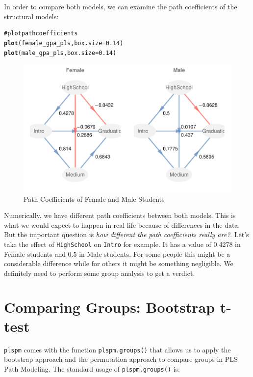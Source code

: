 \documentclass[12pt]{book}\usepackage{graphicx, color}
\makeatletter
\newcommand{\hlfunctioncall}[1]{\textcolor[rgb]{0.501960784313725,0,0.329411764705882}{\textbf{#1}}}%
\newcommand{\hlcomment}[1]{\textcolor[rgb]{0.180392156862745,0.6,0.341176470588235}{#1}}%
\newenvironment{kframe}{%
 \def\at@end@of@kframe{}%
 \ifinner\ifhmode%
  \def\at@end@of@kframe{\end{minipage}}%
  \begin{minipage}{\columnwidth}%
 \fi\fi%
 \def\FrameCommand##1{\hskip\@totalleftmargin \hskip-\fboxsep
 \colorbox{shadecolor}{##1}\hskip-\fboxsep
     \hskip-\linewidth \hskip-\@totalleftmargin \hskip\columnwidth}%
 \MakeFramed {\advance\hsize-\width
   \@totalleftmargin\z@ \linewidth\hsize
   \@setminipage}}%
 {\par\unskip\endMakeFramed%
 \at@end@of@kframe}
\newenvironment{knitrout}{}{} %
\newcommand{\plspm}{\texttt{plspm}}
\newcommand{\code}[1]{\texttt{#1}}
\makeatother
\begin{document}
In order to compare both models, we can examine the path coefficients of the structural models:
\begin{knitrout}
\color{fgcolor}\begin{kframe}
\begin{alltt}
\hlcomment{# plot path coefficients}
\hlfunctioncall{plot}(female_gpa_pls, box.size = 0.14)
\hlfunctioncall{plot}(male_gpa_pls, box.size = 0.14)
\end{alltt}
\end{kframe}\begin{figure}[h]


{\centering \includegraphics[width=1\linewidth,height=.55\linewidth]{figure/gpa_fem_male_models} 

}

\caption[Path Coefficients of Female and Male Students]{Path Coefficients of Female and Male Students\label{fig:gpa_fem_male_models}}
\end{figure}


\end{knitrout}


Numerically, we have different path coefficients between both models. This is what we would expect to happen in real life because of differences in the data. But the important question is \textit{how different the path coefficients really are?}. Let's take the effect of \texttt{HighSchool} on \texttt{Intro} for example. It has a value of 0.4278 in Female students and 0.5 in Male students. For some people this might be a considerable difference while for others it might be something negligible. We definitely need to perform some group analysis to get a verdict.



\section{Comparing Groups: Bootstrap t-test}
\plspm{} comes with the function \code{plspm.groups()} that allows us to apply the bootstrap approach and the permutation approach to compare groups in PLS Path Modeling. The standard usage of \code{plspm.groups()} is:
\end{document}
